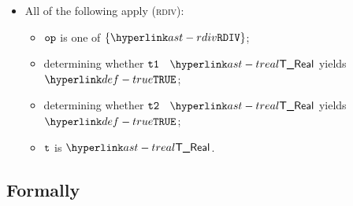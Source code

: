 \begin{itemize}
  \item All of the following apply (\textsc{rdiv}):
  \begin{itemize}
    \item $\op$ is one of $\{\RDIV\}$;
    \item determining whether $\vtone$ \typesatisfies\ $\TReal$ yields $\True$\ProseOrTypeError;
    \item determining whether $\vttwo$ \typesatisfies\ $\TReal$ yields $\True$\ProseOrTypeError;
    \item $\vt$ is $\TReal$.
  \end{itemize}
\end{itemize}



\subsection{Formally}
\begin{mathpar}
\end{mathpar}

\begin{mathpar}
\end{mathpar}

